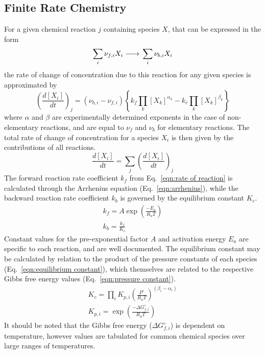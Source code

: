 \documentclass[a4paper]{article}
\begin{document}
\subsection{Finite Rate Chemistry}\label{subsec:finite rate chem}
For a given chemical reaction \(j\) containing species \(X\), that can be expressed in the form 
\begin{equation}
    \sum_i \nu_{f,i} X_i \ce{->} \sum_i \nu_{b,i} X_i 
\end{equation}
the rate of change of concentration due to this reaction for any given species is approximated by
\begin{equation}\label{eqn:rate of reaction}
    \left(\frac{d [X_i]}{d t} \right)_j
    = (\nu_{b,i}-\nu_{f,i}) \left\lbrace k_f \prod_k [X_k]^{\alpha_k} - k_r \prod_k [X_k]^{\beta_k} \right\rbrace
\end{equation}
where \(\alpha\) and \(\beta\) are experimentally determined exponents in the case of non-elementary reactions, and are equal to \(\nu_f\) and \(\nu_b\) for elementary reactions. The total rate of change of concentration for a species \(X_i\) is then given by the contributions of all reactions. 
\begin{equation}
    \frac{d [X_i]}{d t} = \sum_j \left(\frac{d [X_i]}{d t} \right)_j
\end{equation}
The forward reaction rate coefficient \(k_f\) from Eq.~\ref{eqn:rate of reaction} is calculated through the Arrhenius equation (Eq.~\ref{eqn:arrhenius}), while the backward reaction rate coefficient \(k_b\) is governed by the equilibrium constant \(K_c\).
\begin{gather}
    \label{eqn:arrhenius}
    k_f = A\exp\left(\frac{-E_a}{R_uT}\right) \\
    k_b = \frac{k_f}{K_c}
\end{gather}
Constant values for the pre-exponential factor \(A\) and activation energy \(E_a\) are specific to each reaction, and are well documented.  The equilibrium constant may be calculated by relation to the product of the pressure constants of each species (Eq.~\ref{eqn:equilibrium constant}), which themselves are related to the respective Gibbs free energy values (Eq.~\ref{eqn:pressure constant}). 
\begin{gather}
    \label{eqn:equilibrium constant}
    K_c = \prod_i K_{p,i} \left(\frac{P^\circ}{R_u T}\right)^{(\beta_i-\alpha_i)} \\
    \label{eqn:pressure constant}
    K_{p,i} = \exp\left(\frac{-\Delta G^\circ_{f,i}}{R_u T}\right)
\end{gather}
It should be noted that the Gibbs free energy (\(\Delta G^\circ_{f,i}\)) is dependent on temperature, however values are tabulated for common chemical species over large ranges of temperatures. 
\end{document}
